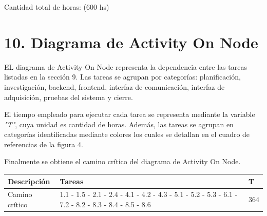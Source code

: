 \documentclass[
11pt%
]{charter}
\begin{document}
Cantidad total de horas: (600 hs)

\section{10. Diagrama de Activity On Node}
\label{sec:AoN}



EL diagrama de Activity On Node representa la dependencia entre las tareas listadas en la sección 9. Las tareas se agrupan por categorías: planificación, investigación, backend, frontend, interfaz de comunicación, interfaz de adquisición, pruebas del sistema y cierre.

El tiempo empleado para ejecutar cada tarea se representa mediante la variable \textit{"T"}, cuya unidad es cantidad de horas. Además, las tareas se agrupan en categorías identificadas mediante colores los cuales se detallan en el cuadro de referencias de la figura 4.

Finalmente se obtiene el camino crítico del diagrama de Activity On Node.

\begin{table}[ht]
\begin{tabularx}{\linewidth}{@{}|l|X|l|@{}}
\hline
\rowcolor[HTML]{C0C0C0} 
Descripción           & Tareas & T \\ \hline	%
Camino crítico      & 1.1 - 1.5 - 2.1 - 2.4 - 4.1 - 4.2 - 4.3 - 5.1 - 5.2 - 5.3 - 6.1 - 7.2 - 8.2 - 8.3 - 8.4 - 8.5 - 8.6      &364	%
       	\\ \hline
\end{tabularx}
\end{table}
\end{document}
